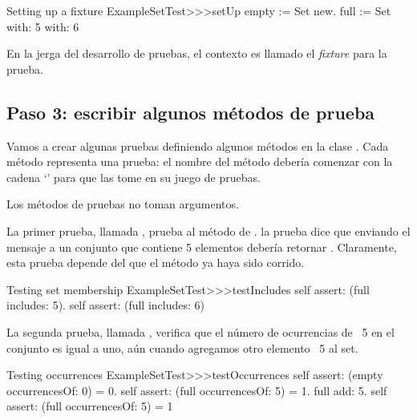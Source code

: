 \documentclass[a4paper,10pt,twoside]{book}
\begin{document}


\begin{method}[setupExampleSetTest]{Setting up a fixture}
ExampleSetTest>>>setUp
	empty := Set new.
	full := Set with: 5 with: 6
\end{method}

\noindent
En la jerga del desarrollo de pruebas, el contexto es llamado el \emph{fixture} para la prueba.


\subsection{Paso 3: escribir algunos m\'etodos de prueba}

Vamos a crear algunas pruebas definiendo algunos m\'etodos en la clase .  
Cada m\'etodo representa una prueba: 
el nombre del m\'etodo deber\'ia comenzar con la cadena `' para que \sunit
las tome en su juego de pruebas.

Los m\'etodos de pruebas no toman argumentos.

La primer prueba, llamada , prueba al m\'etodo
 de .  la prueba dice que enviando el mensaje  a un conjunto
que contiene 5 elementos deber\'ia retornar .  Claramente, esta prueba depende del que el
m\'etodo  ya haya sido corrido.

\begin{method}[testIncludes]{Testing set membership}
ExampleSetTest>>>testIncludes
	self assert: (full includes: 5).
	self assert: (full includes: 6)
\end{method}

La segunda prueba, llamada , verifica que el n\'umero de ocurrencias
de ~5 en el conjunto  es igual a uno, a\'un cuando agregamos otro elemento ~5 al set.

\begin{method}[testOccurrences]{Testing occurrences}
ExampleSetTest>>>testOccurrences
	self assert: (empty occurrencesOf: 0) = 0.
	self assert: (full occurrencesOf: 5) = 1.
	full add: 5.
	self assert: (full occurrencesOf: 5) = 1
\end{method}
\end{document}
